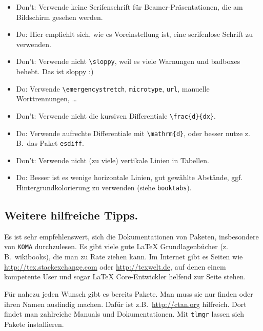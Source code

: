 \documentclass[11pt,
               a4paper,
               parskip=half,
               ]{scrartcl}
\newcommand{\zB}{z.\,B.\xspace}
\newcommand{\textsw}[1]{\texttt{#1}} %
\begin{document}
\begin{itemize}
  \item Don't: Verwende keine Serifenschrift für Beamer-Präsentationen,
    die am Bildschirm gesehen werden.
  \item Do: Hier empfiehlt sich, wie es Voreinstellung ist,
    eine serifenlose Schrift zu verwenden.
\end{itemize}

\begin{itemize}
  \item Don't: Verwende nicht \verb+\sloppy+,
    weil es viele Warnungen und badboxes behebt. Das ist sloppy :)
  \item Do: Verwende \verb+\emergencystretch+, \textsw{microtype}, \textsw{url},
    manuelle Worttrennungen, \dots
\end{itemize}

\begin{itemize}
  \item Don't: Verwende nicht die kursiven Differentiale \verb+\frac{d}{dx}+.
  \item Do: Verwende aufrechte Differentiale mit \verb+\mathrm{d}+,
    oder besser nutze \zB~das Paket \textsw{esdiff}.
\end{itemize}

\begin{itemize}
  \item Don't: Verwende nicht (zu viele) vertikale Linien in Tabellen.
  \item Do: Besser ist es wenige horizontale Linien, gut gewählte Abstände,
    ggf. Hintergrundkolorierung zu verwenden (siehe \textsw{booktabs}).
\end{itemize}

\subsection{Weitere hilfreiche Tipps.}
Es ist sehr empfehlenswert, sich die Dokumentationen von Paketen,
insbesondere von \textsw{KOMA} durchzulesen.
Es gibt viele gute \LaTeX{} Grundlagenbücher (\zB~wikibooks),
die man zu Rate ziehen kann.
Im Internet gibt es Seiten wie \url{http://tex.stackexchange.com}
oder \url{http://texwelt.de}, auf denen einem kompetente User
und sogar \LaTeX{} Core-Entwickler helfend zur Seite stehen.

Für nahezu jeden Wunsch gibt es bereits Pakete.
Man muss sie nur finden oder ihren Namen ausfindig machen.
Dafür ist z.B.~\url{http://ctan.org} hilfreich.
Dort findet man zahlreiche Manuals und Dokumentationen.
Mit \textsw{tlmgr} lassen sich Pakete installieren.
\end{document}
